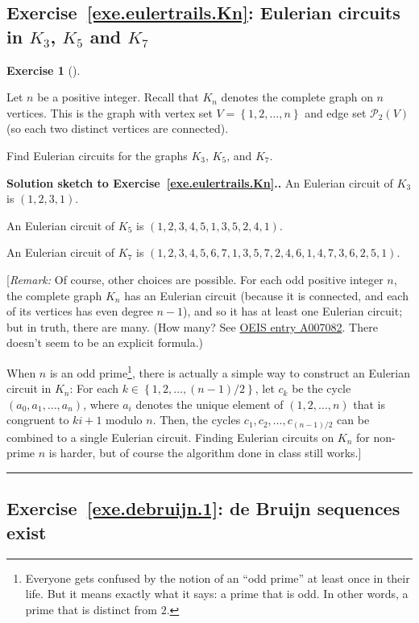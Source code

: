 \documentclass[numbers=enddot,12pt,final,onecolumn,notitlepage]{scrartcl}%
\newcounter{exer}
\theoremstyle{definition}
\newtheorem{exmp}[exer]{Exercise}
\newenvironment{exercise}[1][]
{\begin{exmp}[#1]\begin{leftbar}}
{\end{leftbar}\end{exmp}}
\newenvironment{proof}[1][Proof]{\noindent\textbf{#1.} }{\ \rule{0.5em}{0.5em}}
\newcommand{\set}[1]{\left\{ #1 \right\}}
\newcommand{\tup}[1]{\left( #1 \right)}
\begin{document}
\subsection{Exercise~\ref{exe.eulertrails.Kn}: Eulerian circuits in
$K_3$, $K_5$ and $K_7$}

\begin{exercise} \label{exe.eulertrails.Kn}
Let $n$ be a positive integer. Recall that $K_n$ denotes the complete
graph on $n$ vertices. This is the graph with vertex set $V =
\set{1, 2, \ldots, n}$ and edge set $\mathcal{P}_2\tup{V}$ (so each two
distinct vertices are connected).

Find Eulerian circuits for the graphs $K_3$, $K_5$, and $K_7$.
\end{exercise}

\begin{proof}[Solution sketch to Exercise~\ref{exe.eulertrails.Kn}.]
An Eulerian circuit of $K_3$ is $\tup{1, 2, 3, 1}$.

An Eulerian circuit of $K_5$ is
$\tup{1, 2, 3, 4, 5, 1, 3, 5, 2, 4, 1}$.

An Eulerian circuit of $K_7$ is
$\tup{1, 2, 3, 4, 5, 6, 7,
      1, 3, 5, 7, 2, 4, 6,
      1, 4, 7, 3, 6, 2, 5,
      1}$.

[\textit{Remark:} Of course, other choices are possible. For each
odd positive integer $n$, the complete graph $K_n$ has an Eulerian
circuit (because it is connected, and each of its vertices has even
degree $n-1$), and so it has at least one Eulerian circuit; but in
truth, there are many. (How many? See
\href{http://oeis.org/A007082}{OEIS entry A007082}. There doesn't seem
to be an explicit formula.)

When $n$ is an odd prime\footnote{Everyone gets confused by the notion
of an ``odd prime'' at least once in their life. But it means exactly
what it says: a prime that is odd. In other words, a prime that is
distinct from $2$.}, there is actually a simple way to construct
an Eulerian circuit in $K_n$: For each $k \in \set{1, 2, \ldots,
\tup{n-1}/2}$, let $c_k$ be the cycle $\tup{a_0, a_1, \ldots, a_n}$,
where $a_i$ denotes the unique element of $\tup{1, 2, \ldots, n}$ that
is congruent to $ki + 1$ modulo $n$. Then, the cycles $c_1, c_2,
\ldots, c_{\tup{n-1}/2}$ can be combined to a single Eulerian circuit.
Finding Eulerian circuits on $K_n$ for non-prime $n$ is harder, but
of course the algorithm done in class still works.]
\end{proof}

\subsection{Exercise~\ref{exe.debruijn.1}: de Bruijn sequences exist}
\end{document}
